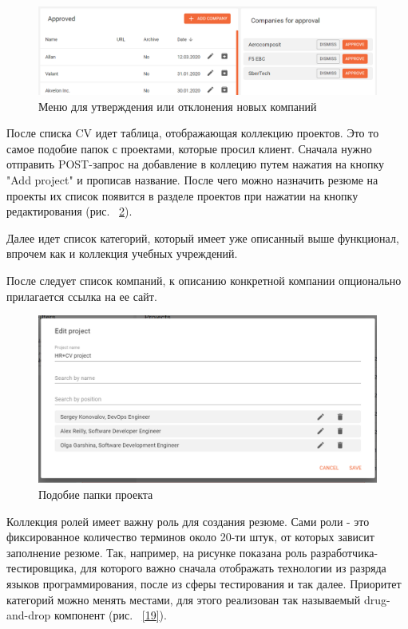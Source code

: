 \documentclass[a4paper,12pt]{diplom}
\begin{document}
\begin{figure}[!ht]
	\centering
	\includegraphics[width=1\textwidth]{resources/companies.png}
	\caption{Меню для утверждения или отклонения новых компаний}
	\label{17}
\end{figure}
После списка CV идет таблица, отображающая коллекцию проектов. Это то самое подобие папок с проектами, которые просил клиент. Сначала нужно отправить POST-запрос на добавление в коллецию
путем нажатия на кнопку "Add project" и прописав название. После чего можно назначить резюме на проекты их список появится в разделе проектов при нажатии на кнопку редактирования (рис. ~\ref{18}).

Далее идет список категорий, который имеет уже описанный выше функционал, впрочем как и коллекция учебных учреждений.

После следует список компаний, к описанию конкретной компании опционально прилагается ссылка на ее сайт.

\begin{figure}[!ht]
	\centering
	\includegraphics[width=1\textwidth]{resources/editProject.png}
	\caption{Подобие папки проекта}
	\label{18}
\end{figure}

Коллекция ролей имеет важну роль для создания резюме. Сами роли - это фиксированное количество терминов около 20-ти штук, от которых зависит заполнение резюме.
Так, например, на рисунке показана роль разработчика-тестировщика, для которого важно сначала отображать технологии из разряда языков программирования, после из сферы тестирования и так далее.
Приоритет категорий можно менять местами, для этого реализован так называемый drug-and-drop компонент (рис. ~\ref{19}).
\end{document}
